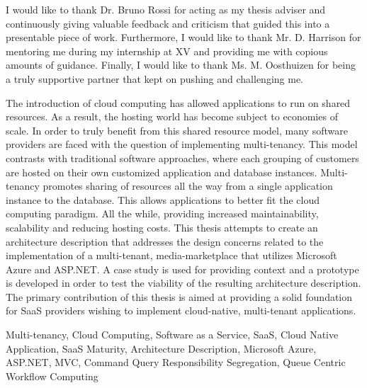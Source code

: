 \documentclass[12pt,oneside]{fithesis2}
\begin{document}
\FrontMatter
\ThesisTitlePage
\begin{ThesisDeclaration}
\DeclarationText
\AdvisorName
\end{ThesisDeclaration}
\begin{ThesisThanks}
I would like to thank Dr. Bruno Rossi for acting as my thesis adviser and continuously giving valuable feedback and criticism that guided this into a presentable piece of work. Furthermore, I would like to thank Mr. D. Harrison for mentoring me during my internship at XV and providing me with copious amounts of guidance. Finally, I would like to thank Ms. M. Oosthuizen for being a truly supportive partner that kept on pushing and challenging me. 
\end{ThesisThanks}
\begin{ThesisAbstract}
The introduction of cloud computing has allowed applications to run on shared resources. As a result, the hosting world has become subject to economies of scale. In order to truly benefit from this shared resource model, many software providers are faced with the question of implementing multi-tenancy. This model contrasts with traditional software approaches, where each grouping of customers are hosted on their own customized application and database  instances. Multi-tenancy promotes sharing of resources all the way from a single application instance to the database. This allows applications to better fit the cloud computing paradigm. All the while, providing increased maintainability, scalability and reducing hosting costs. This thesis attempts to create an architecture description that addresses the design concerns related to the implementation of a multi-tenant, media-marketplace that utilizes Microsoft Azure and ASP.NET. A case study is used for providing context and a prototype is developed in order to test the viability of the resulting architecture description. The primary contribution of this thesis is aimed at providing a solid foundation for SaaS providers wishing to implement cloud-native, multi-tenant applications.  
\end{ThesisAbstract}
\begin{ThesisKeyWords}
Multi-tenancy, Cloud Computing, Software as a Service, SaaS, Cloud Native Application, SaaS Maturity, Architecture Description, Microsoft Azure, ASP.NET, MVC, Command Query Responsibility Segregation, Queue Centric Workflow Computing
\end{ThesisKeyWords}
\MainMatter
\tableofcontents %
\listoffigures
\listoftables










\printbibliography{}
\printindex
\appendix





\end{document}
